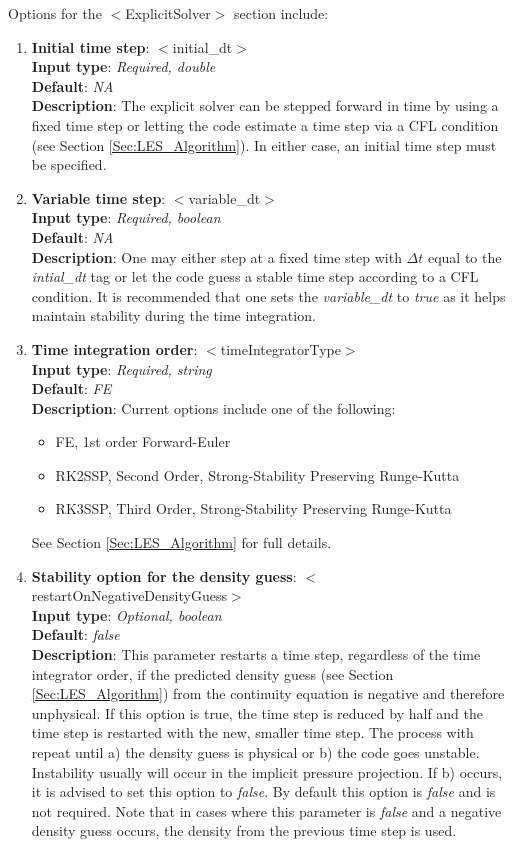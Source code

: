 Options for the $<$ExplicitSolver$>$ section include:
\begin{enumerate}
%
\item {\bf Initial time step}: $<$initial\_dt$>$ \\
{\bf Input type}: {\it Required, double} \\
{\bf Default}: {\it NA } \\ 
{\bf Description}: The explicit solver can be stepped forward in time by using a fixed time step or letting the code estimate a time step via a CFL condition (see Section \ref{Sec:LES_Algorithm}).  In either case, an initial time step must be specified. 
%
\item {\bf Variable time step}: $<$variable\_dt$>$ \\
{\bf Input type}: {\it Required, boolean} \\
{\bf Default}: {\it NA } \\ 
{\bf Description}: One may either step at a fixed time step with $\Delta t$ equal to the {\it intial\_dt} tag or let the code guess a stable time step according to a CFL condition. It is recommended that one sets the {\it variable\_dt} to {\it true}  as it helps maintain stability during the time integration.
%
\item {\bf Time integration order}: $<$timeIntegratorType$>$ \\
 {\bf Input type}: {\it Required, string} \\
 {\bf Default}: {\it FE}  \\  
 {\bf Description}: Current options include one of the following: \\ 
 \begin{itemize}
  \item FE, 1st order Forward-Euler 
  \item RK2SSP, Second Order, Strong-Stability Preserving Runge-Kutta 
  \item RK3SSP, Third Order, Strong-Stability Preserving Runge-Kutta 
 \end{itemize}
 See Section \ref{Sec:LES_Algorithm} for full details.
\item {\bf Stability option for the density guess}: $<$restartOnNegativeDensityGuess$>$ \\
 {\bf Input type}: {\it Optional, boolean} \\
 {\bf Default}: {\it false} \\
 {\bf Description}: This parameter restarts a time step, regardless of the time integrator order, if the predicted density guess (see Section \ref{Sec:LES_Algorithm}) from the continuity equation is  negative and therefore unphysical.  If this option is true, the time step is reduced by half and the time step is restarted with the new, smaller time step.  The process with repeat until a) the density guess is physical or b) the code goes unstable.  Instability usually will occur in the implicit pressure projection.  If b) occurs, it is advised to set this option to {\it false}.  By default this option is {\it false} and is not required.  Note that in cases where this parameter is {\it false} and a negative density guess occurs, the density from the previous time step is used.   

\end{enumerate}
